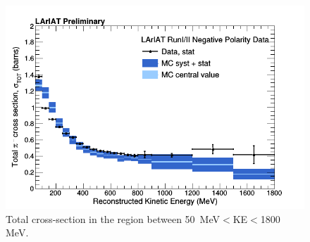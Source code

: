 \begin{figure}[h!]
\centering
\includegraphics[scale=0.60]{./images/TotalCrossSection.png}
\caption{Total cross-section in the region between 50~MeV$<$KE$<$1800 MeV. }
\label{fig:VariableBinCrossSection}
\end{figure}

\clearpage


\newpage